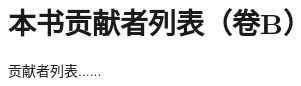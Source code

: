 \intobmk\chapter*{本书贡献者列表（卷B）}%
\setcounter{page}{1}%

\begin{flushleft}  %
\setlength{\parindent}{2em} %

贡献者列表......

\end{flushleft}
